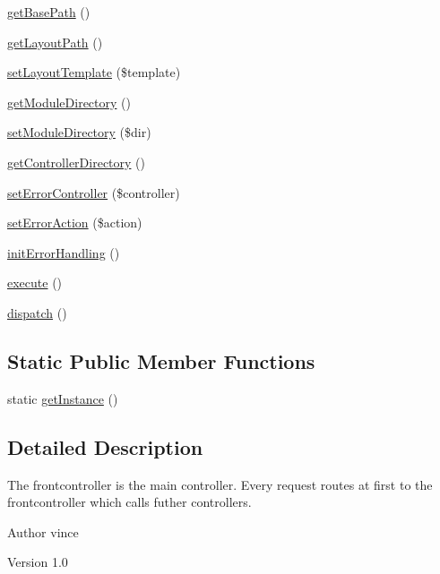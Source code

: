 \begin{DoxyCompactItemize}
\hyperlink{class_anemo_1_1_controller_1_1_frontcontroller_aaf4a9649667a3904fae19e9bd27ebd67}{getBasePath} ()
\item 
\hyperlink{class_anemo_1_1_controller_1_1_frontcontroller_abc6f0c7a83921cf10e85fab3524e6cab}{getLayoutPath} ()
\item 
\hyperlink{class_anemo_1_1_controller_1_1_frontcontroller_a0e09b1e62bb6321aa1bd388e1a0766ef}{setLayoutTemplate} (\$template)
\item 
\hyperlink{class_anemo_1_1_controller_1_1_frontcontroller_a484053c8cafaa864f7dff745f7eb1198}{getModuleDirectory} ()
\item 
\hyperlink{class_anemo_1_1_controller_1_1_frontcontroller_abee94a656a5297cb451ff8fe95901e5a}{setModuleDirectory} (\$dir)
\item 
\hyperlink{class_anemo_1_1_controller_1_1_frontcontroller_aa43f16ec7415769fee4be5e49a52f93b}{getControllerDirectory} ()
\item 
\hyperlink{class_anemo_1_1_controller_1_1_frontcontroller_a7c94b5c43692cab27b603c08c2277d73}{setErrorController} (\$controller)
\item 
\hyperlink{class_anemo_1_1_controller_1_1_frontcontroller_ab5c738994c3a2ff1df6fc5900462585a}{setErrorAction} (\$action)
\item 
\hyperlink{class_anemo_1_1_controller_1_1_frontcontroller_afe34a8388a83ac3d0404476c4ba2229f}{initErrorHandling} ()
\item 
\hyperlink{class_anemo_1_1_controller_1_1_frontcontroller_a1909f4b7f8129c7790cb75de2ffbe1e4}{execute} ()
\item 
\hyperlink{class_anemo_1_1_controller_1_1_frontcontroller_ac9b4976d41cd6b50add18c46b165c03d}{dispatch} ()
\end{DoxyCompactItemize}
\subsection*{Static Public Member Functions}
\begin{DoxyCompactItemize}
\item 
static \hyperlink{class_anemo_1_1_controller_1_1_frontcontroller_ac93fbec81f07e5d15f80db907e63dc10}{getInstance} ()
\end{DoxyCompactItemize}


\subsection{Detailed Description}
The frontcontroller is the main controller. Every request routes at first to the frontcontroller which calls futher controllers. \begin{DoxyAuthor}{Author}
vince 
\end{DoxyAuthor}
\begin{DoxyVersion}{Version}
1.0 
\end{DoxyVersion}


